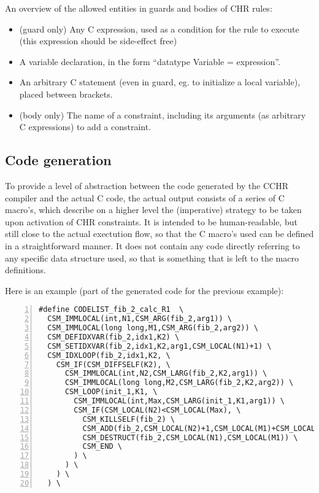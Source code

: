 \documentclass{llncs}
\begin{document}
An overview of the allowed entities in guards and bodies of CHR rules: \begin{itemize}
  \item (guard only) Any C expression, used as a condition for the rule to execute (this expression should be side-effect free)
  \item A variable declaration, in the form ``datatype Variable = expression''.
  \item An arbitrary C statement (even in guard, eg. to initialize a local variable), placed between  brackets.
  \item (body only) The name of a constraint, including its arguments (as arbitrary C expressions) to add a constraint.
\end{itemize}

\subsection{Code generation}

To provide a level of abstraction between the code generated by the CCHR compiler and the actual C code, the actual output
consists of a series of C macro's, which describe on a higher level the (imperative) strategy to be taken upon activation of
CHR constraints. It is intended to be human-readable, but still close to the actual exectution flow, so that the C macro's
used can be defined in a straightforward manner. It does not contain any code directly referring to any specific data
structure used, so that is something that is left to the macro definitions.

Here is an example (part of the generated code for the previous example): \begin{Verbatim}[numbers=left]
#define CODELIST_fib_2_calc_R1  \ 
  CSM_IMMLOCAL(int,N1,CSM_ARG(fib_2,arg1)) \ 
  CSM_IMMLOCAL(long long,M1,CSM_ARG(fib_2,arg2)) \ 
  CSM_DEFIDXVAR(fib_2,idx1,K2) \ 
  CSM_SETIDXVAR(fib_2,idx1,K2,arg1,CSM_LOCAL(N1)+1) \ 
  CSM_IDXLOOP(fib_2,idx1,K2, \ 
    CSM_IF(CSM_DIFFSELF(K2), \ 
      CSM_IMMLOCAL(int,N2,CSM_LARG(fib_2,K2,arg1)) \ 
      CSM_IMMLOCAL(long long,M2,CSM_LARG(fib_2,K2,arg2)) \ 
      CSM_LOOP(init_1,K1, \ 
        CSM_IMMLOCAL(int,Max,CSM_LARG(init_1,K1,arg1)) \ 
        CSM_IF(CSM_LOCAL(N2)<CSM_LOCAL(Max), \ 
          CSM_KILLSELF(fib_2) \ 
          CSM_ADD(fib_2,CSM_LOCAL(N2)+1,CSM_LOCAL(M1)+CSM_LOCAL(M2)) \ 
          CSM_DESTRUCT(fib_2,CSM_LOCAL(N1),CSM_LOCAL(M1)) \ 
          CSM_END \ 
        ) \ 
      ) \ 
    ) \ 
  ) \ 
\end{Verbatim}
\end{document}
